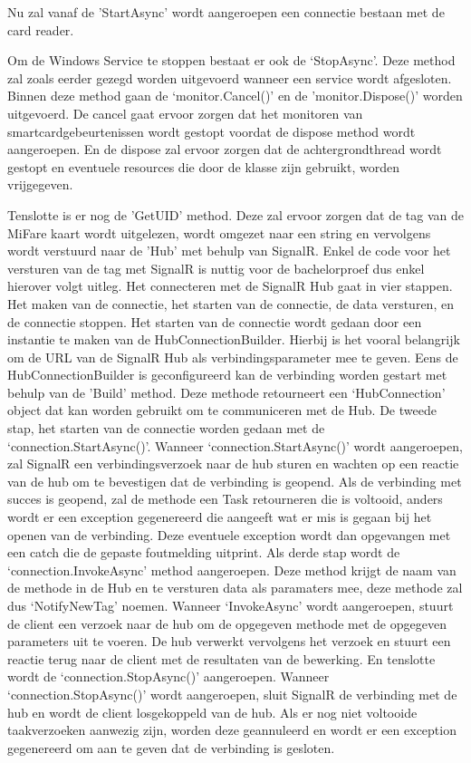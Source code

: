 Nu zal vanaf de 'StartAsync’ wordt aangeroepen een connectie bestaan met de card reader. 

Om de Windows Service te stoppen bestaat er ook de ‘StopAsync’. Deze method zal zoals eerder gezegd worden uitgevoerd wanneer een service wordt afgesloten. Binnen deze method gaan de ‘monitor.Cancel()’ en de 'monitor.Dispose()’ worden uitgevoerd. De cancel gaat ervoor zorgen dat het monitoren van smartcardgebeurtenissen wordt gestopt voordat de dispose method wordt aangeroepen. En de dispose zal ervoor zorgen dat de achtergrondthread wordt gestopt en eventuele resources die door de klasse zijn gebruikt, worden vrijgegeven. 

Tenslotte is er nog de 'GetUID’ method. Deze zal ervoor zorgen dat de tag van de MiFare kaart wordt uitgelezen, wordt omgezet naar een string en vervolgens wordt verstuurd naar de 'Hub’ met behulp van SignalR. Enkel de code voor het versturen van de tag met SignalR is nuttig voor de bachelorproef dus enkel hierover volgt uitleg. Het connecteren met de SignalR Hub gaat in vier stappen. Het maken van de connectie, het starten van de connectie, de data versturen, en de connectie stoppen. Het starten van de connectie wordt gedaan door een instantie te maken van de HubConnectionBuilder. Hierbij is het vooral belangrijk om de URL van de SignalR Hub als verbindingsparameter mee te geven. Eens de HubConnectionBuilder is geconfigureerd kan de verbinding worden gestart met behulp van de 'Build’ method. Deze methode retourneert een ‘HubConnection’ object dat kan worden gebruikt om te communiceren met de Hub. De tweede stap, het starten van de connectie worden gedaan met de ‘connection.StartAsync()’. Wanneer ‘connection.StartAsync()’ wordt aangeroepen, zal SignalR een verbindingsverzoek naar de hub sturen en wachten op een reactie van de hub om te bevestigen dat de verbinding is geopend. Als de verbinding met succes is geopend, zal de methode een Task retourneren die is voltooid, anders wordt er een exception gegenereerd die aangeeft wat er mis is gegaan bij het openen van de verbinding. Deze eventuele exception wordt dan opgevangen met een catch die de gepaste foutmelding uitprint. Als derde stap wordt de ‘connection.InvokeAsync’ method aangeroepen. Deze method krijgt de naam van de methode in de Hub en te versturen data als paramaters mee, deze methode zal dus ‘NotifyNewTag’ noemen. Wanneer ‘InvokeAsync’ wordt aangeroepen, stuurt de client een verzoek naar de hub om de opgegeven methode met de opgegeven parameters uit te voeren. De hub verwerkt vervolgens het verzoek en stuurt een reactie terug naar de client met de resultaten van de bewerking. En tenslotte wordt de ‘connection.StopAsync()’ aangeroepen. Wanneer ‘connection.StopAsync()’ wordt aangeroepen, sluit SignalR de verbinding met de hub en wordt de client losgekoppeld van de hub. Als er nog niet voltooide taakverzoeken aanwezig zijn, worden deze geannuleerd en wordt er een exception gegenereerd om aan te geven dat de verbinding is gesloten.

